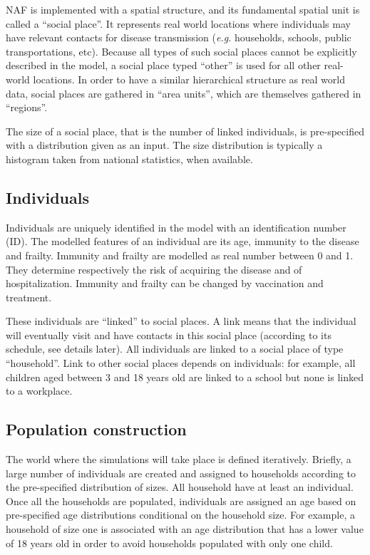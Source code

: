 \documentclass[11pt, onecolumn]{article}
\newcommand{\eg}{\textit{e.g.}\xspace}
\newcommand{\naf}{\textsf{NAF}\xspace}
\begin{document}
\naf is implemented with a spatial structure, and its fundamental spatial unit is called a ``social place''. It represents real world locations where individuals may have relevant contacts for disease transmission (\eg households, schools, public transportations, etc). Because all types of such social places cannot be explicitly described in the model, a social place typed ``other'' is used for all other real-world locations.
In order to have a similar hierarchical structure as real world data, social places are gathered in ``area units'', which are themselves gathered in ``regions''.

The size of a social place, that is the number of linked individuals, is pre-specified with a distribution given as an input. The size distribution is typically a histogram taken from national statistics, when available. 




\subsection{Individuals}

Individuals are uniquely identified in the model with an identification number (ID). The modelled features of an individual are its age, immunity to the disease and frailty. Immunity and frailty are modelled as real number between 0 and 1. They determine respectively the risk of acquiring the disease and of hospitalization. Immunity and frailty can be changed by vaccination and  treatment.

These individuals are ``linked'' to social places. A link means that the individual will eventually visit and have contacts in this social place (according to its schedule, see details later).
All individuals are linked to a social place of type ``household''. Link to other social places depends on individuals: for example, all children aged between 3 and 18 years old are linked to a school but none is linked to a workplace. 


\subsection{Population construction}

The world where the simulations will take place is defined iteratively. Briefly, a large number of individuals are created and assigned to households according to the pre-specified distribution of sizes. All household have at least an individual. Once all the households are populated, individuals are assigned an age based on pre-specified age distributions conditional on the household size. For example, a household of size one is associated with an age distribution that has a lower value of 18 years old in order to avoid households populated with only one child.
\end{document}
